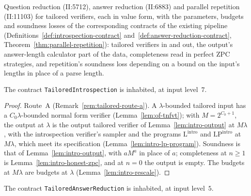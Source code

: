 \begin{definition}
\label{def:tailored-stages}
\leanok
Question reduction (II:5712), answer reduction (II:6883) and parallel repetition (II:11103) for
tailored verifiers, each in value form, with the parameters, budgets and soundness losses of
the corresponding contracts of the existing pipeline
(Definitions~\ref{def:introspection-contract} and~\ref{def:answer-reduction-contract},
Theorem~\ref{thm:parallel-repetition}): tailored verifiers in and out, the output's
answer-length calculator part of the data, completeness read in perfect ZPC strategies, and
repetition's soundness loss depending on a bound on the input's lengths in place of a parse
length.
\end{definition}

\begin{theorem}
\label{thm:tailored-qr}
\leanok
The contract \texttt{TailoredIntrospection} is inhabited, at input level~$7$.
\end{theorem}

\begin{proof}
\leanok
Route~A (Remark~\ref{rem:tailored-route-a}). A $\lambda$-bounded tailored input has a
$C_0\lambda$-bounded normal form verifier (Lemma~\ref{lem:of-tnfvt}); with $M = 2^{C_0 + 1}$, the
output at $\lambda$ is the output tailored verifier of Lemma~\ref{lem:intro-output} at
$M\lambda$, with the introspection verifier's sampler and the programs
$\mathrm{L}^{\mathrm{intro}}$ and $\mathrm{LP}^{\mathrm{intro}}$ at $M\lambda$, which meet its
specification (Lemma~\ref{lem:intro-lp-program}). Soundness is that of
Lemma~\ref{lem:intro-output}, with $a M^a$ in place of $a$; completeness at $n \geq 1$ is
Lemma~\ref{lem:intro-honest-zpc}, and at $n = 0$ the output is empty. The budgets at $M\lambda$
are budgets at $\lambda$ (Lemma~\ref{lem:intro-rescale}).
\end{proof}

\begin{theorem}
\label{thm:tailored-ar}
\leanok
The contract \texttt{TailoredAnswerReduction} is inhabited, at input level~$5$.
\end{theorem}


